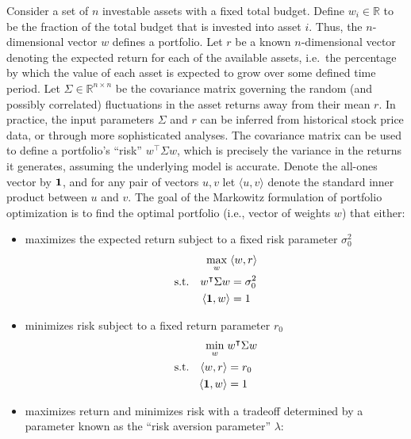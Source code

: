 \begin{refsection}
Consider a set of $n$ investable assets with a fixed total budget. Define $w_i \in \mathbb{R}$ to be the fraction of the total budget that is invested into asset $i$. Thus, the $n$-dimensional vector $w$ defines a portfolio. Let $r$ be a known $n$-dimensional vector denoting the expected return for each of the available assets, i.e.~the percentage by which the value of each asset is expected to grow over some defined time period. Let $\Sigma\in\mathbb{R}^{n\times n}$ be the covariance matrix governing the random (and possibly correlated) fluctuations in the asset returns away from their mean $r$.
In practice, the input parameters $\Sigma$ and $r$ can be inferred from historical stock price data, or through more sophisticated analyses.
The covariance matrix can be used to define a portfolio's ``risk'' $w^\intercal \Sigma w$, which is precisely the variance in the returns it generates, assuming the underlying model is accurate. Denote the all-ones vector by $\mathbf{1}$, and for any pair of vectors $u,v$ let $\langle u,v\rangle$ denote the standard inner product between $u$ and $v$. The goal of the Markowitz formulation of portfolio optimization is to find the optimal portfolio (i.e., vector of weights $w$) that either:
\begin{itemize}
    \item maximizes the expected return subject to a fixed risk parameter $\sigma_0^2$
    \begin{equation}
    \begin{split}
     \max_{w}\; &\langle w,r\rangle \\
    \mathrm{s.t.}\quad w^\intercal \Sigma w&=\sigma_0^2\\
    \quad \langle \mathbf{1}, w\rangle &=1
    \end{split}
    \end{equation}
    \item minimizes risk subject to a fixed return parameter $r_0$
    \begin{equation}
    \begin{split}\label{eq:PO_fixed_return}
    \min_{w}\;  &w^\intercal \Sigma w\\
    \mathrm{s.t.}\quad \langle w,r\rangle &=r_0\\
    \langle \mathbf{1}, w\rangle &=1
    \end{split}
    \end{equation}
    \item maximizes return and minimizes risk with a tradeoff determined by a parameter known as the ``risk aversion parameter'' $\lambda$:

\end{itemize}
\end{refsection}
